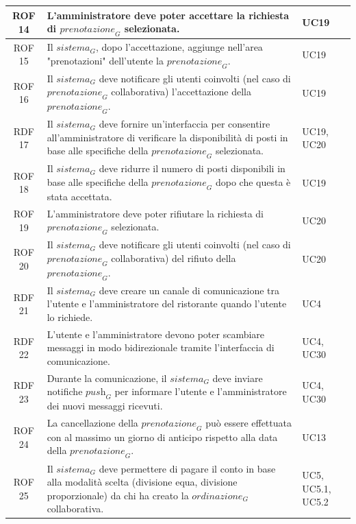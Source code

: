 \documentclass[12pt, oneside]{article}
\begin{document}
\begin{longtable}{|c|p{14cm}|p{2cm}|}
    \hline
    ROF 14& L'amministratore deve poter accettare la richiesta di $\textit{prenotazione}_G$ selezionata. & UC19 \\
    \hline
    ROF 15& Il $\textit{sistema}_G$, dopo l'accettazione, aggiunge nell'area "prenotazioni" dell'utente la $\textit{prenotazione}_G$. & UC19 \\
    \hline
    ROF 16& Il $\textit{sistema}_G$ deve notificare gli utenti coinvolti (nel caso di $\textit{prenotazione}_G$ collaborativa) l'accettazione della $\textit{prenotazione}_G$. & UC19 \\
    \hline
    RDF 17& Il $\textit{sistema}_G$ deve fornire un'interfaccia per consentire all'amministratore di verificare la disponibilità di posti in base alle specifiche della $\textit{prenotazione}_G$ selezionata. & UC19, UC20 \\
    \hline
    ROF 18& Il $\textit{sistema}_G$ deve ridurre il numero di posti disponibili in base alle specifiche della $\textit{prenotazione}_G$ dopo che questa è stata accettata. & UC19 \\
    \hline
    ROF 19& L'amministratore deve poter rifiutare la richiesta di $\textit{prenotazione}_G$ selezionata. & UC20 \\
    \hline
    ROF 20& Il $\textit{sistema}_G$ deve notificare gli utenti coinvolti (nel caso di $\textit{prenotazione}_G$ collaborativa) del rifiuto della $\textit{prenotazione}_G$. & UC20 \\
    \hline
    RDF 21& Il $\textit{sistema}_G$ deve creare un canale di comunicazione tra l'utente e l'amministratore del ristorante quando l'utente lo richiede. & UC4 \\
    \hline
    RDF 22& L'utente e l'amministratore devono poter scambiare messaggi in modo bidirezionale tramite l'interfaccia di comunicazione. & UC4, UC30 \\
    \hline
    RDF 23& Durante la comunicazione, il $\textit{sistema}_G$ deve inviare notifiche $\textit{push}_G$ per informare l'utente e l'amministratore dei nuovi messaggi ricevuti. & UC4, UC30 \\
    \hline
    ROF 24&  La cancellazione della $\textit{prenotazione}_G$ può essere effettuata con al massimo un giorno di anticipo rispetto alla data della $\textit{prenotazione}_G$.  & UC13 \\ 
    \hline
    ROF 25& Il $\textit{sistema}_G$ deve permettere di pagare il conto in base alla modalità scelta (divisione equa, divisione proporzionale) da chi ha creato la $\textit{ordinazione}_G$ collaborativa. & UC5, UC5.1, UC5.2 \\

\end{longtable}
\end{document}

